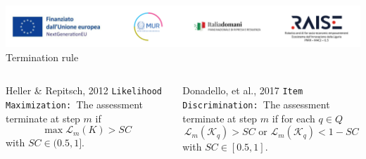 \documentclass{beamer}
\begin{document}
\begin{frame}{\includegraphics[scale=0.4]{Da_cambiare.png} \\ Termination rule}{ } 
  \begin{columns}
\footnotesize
\begin{block}{Heller \& Repitsch, 2012 }
 \texttt{Likelihood Maximization: }The assessment terminate at step $m$ if 
\[
\max\mathcal{L}_{m}(K) > SC
\]
with $SC \in (0.5,1]$. 
\end{block}

\begin{block}{Donadello, et al., 2017 }
\texttt{Item Discrimination: }The assessment terminate at step $m$ if for each $q \in Q$
\[
\mathcal{L}_{m}(\mathcal{K}_q) > SC \text{ or } \mathcal{L}_{m}(\mathcal{K}_q) < 1-SC
\]
with $SC \in [0.5,1]$. 
\end{block}



\end{columns}
\end{frame}
\end{document}
